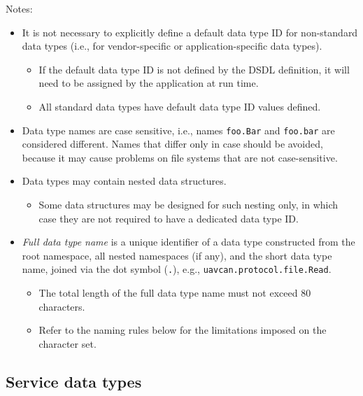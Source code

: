 Notes:

\begin{itemize}
    \item It is not necessary to explicitly define a default data type ID for non-standard data types
          (i.e., for vendor-specific or application-specific data types).
    \begin{itemize}
        \item If the default data type ID is not defined by the DSDL definition,
              it will need to be assigned by the application at run time.
        \item All standard data types have default data type ID values defined.
    \end{itemize}

    \item Data type names are case sensitive, i.e., names \verb|foo.Bar| and \verb|foo.bar| are considered different.
          Names that differ only in case should be avoided, because it may cause problems on file systems that are not
          case-sensitive.

    \item Data types may contain nested data structures.
    \begin{itemize}
        \item Some data structures may be designed for such nesting only,
              in which case they are not required to have a dedicated data type ID.
    \end{itemize}

    \item \emph{Full data type name} is a unique identifier of a data type constructed from the root namespace,
          all nested namespaces (if any), and the short data type name, joined via the dot symbol (\verb|.|),
          e.g., \verb|uavcan.protocol.file.Read|.
    \begin{itemize}
        \item The total length of the full data type name must not exceed 80 characters.
        \item Refer to the naming rules below for the limitations imposed on the character set.
    \end{itemize}
\end{itemize}

\subsection{Service data types}

